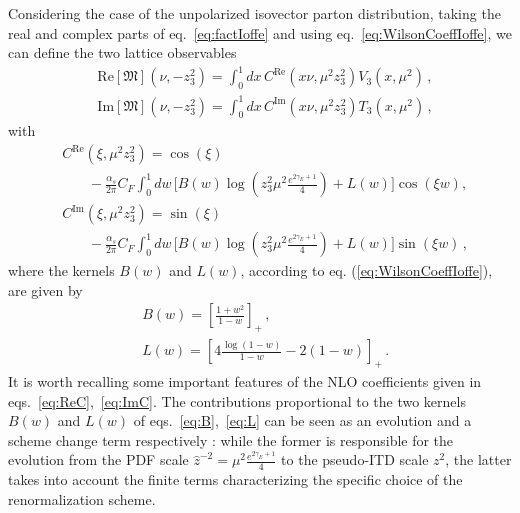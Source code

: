 Considering the case of the unpolarized isovector parton distribution, 
taking the real and complex parts of eq.~\eqref{eq:factIoffe} and using eq.~\eqref{eq:WilsonCoeffIoffe}, 
we can define the two lattice observables
\begin{align}
	\label{eq:Reppdf}
    &\text{Re}\left[\mathfrak{M}\right]\left(\nu, -z_3^2\right) 
    = \int_{0}^{1} dx\,C^{\text{Re}}\left(x\nu,\mu^2 z_3^2\right)V_3\left(x,\mu^2\right)\, ,\\
	\label{eq:Imppdf}
    &\text{Im}\left[\mathfrak{M}\right]\left(\nu, -z_3^2\right) 
    = \int_{0}^{1} dx\,C^{\text{Im}}\left(x\nu,\mu^2 z_3^2\right)T_3\left(x,\mu^2\right)\, ,
\end{align}
with
\begin{align}
	\label{eq:ReC}
	&C^{\text{Re}}\left(\xi,\mu^2 z_3^2\right) 
    = \cos\left(\xi\right) \nonumber\\
    &\,\,\,\,\,\,\,\,\,\,\,-\frac{\alpha_s}{2\pi} C_F \int_0^1 dw \, \biggl[B\left(w\right) 
    \log\left(z_3^2\mu^2\frac{e^{2\gamma_E + 1}}{4}\right) + L\left(w\right)\biggr] \cos\left(\xi w\right), \\
    \label{eq:ImC}
	&C^{\text{Im}}\left(\xi,\mu^2 z_3^2\right) 
    = \sin\left(\xi\right) \nonumber\\
    &\,\,\,\,\,\,\,\,\,\,\,-\frac{\alpha_s}{2\pi} C_F \int_0^1 dw \, \biggl[B\left(w\right)
    \log\left(z_3^2\mu^2\frac{e^{2\gamma_E + 1}}{4}\right)  + L\left(w\right)\biggr] \sin\left(\xi w\right)\, ,
\end{align}
where the kernels $B\left(w\right)$ and $L\left(w\right)$, 
according to eq. (\ref{eq:WilsonCoeffIoffe}), are given by 
\begin{align}
    \label{eq:B}
    &B\left(w\right) = \left[\frac{1+w^2}{1-w}\right]_+ \, ,\\
    \label{eq:L}
    &L\left(w\right) = \left[4\frac{\log\left(1-w\right)}{1-w} -2\left(1-w\right)\right]_+ \, .
\end{align}
It is worth recalling some important features of the NLO coefficients given in eqs.~\eqref{eq:ReC},~\eqref{eq:ImC}.
The contributions proportional to the two kernels $B\left(w\right)$ and $L\left(w\right)$ of eqs.~\eqref{eq:B},~\eqref{eq:L} 
can be seen as an evolution and a scheme change term respectively \cite{Joo:2019jct,Radyushkin:2018cvn}: 
while the former is responsible for the evolution from the PDF scale 
$\hat{z}^{-2} = \mu^2\frac{e^{2\gamma_E + 1}}{4} $ to the pseudo-ITD scale $z^2$, the latter takes into
account the finite terms characterizing the specific choice of the renormalization scheme. 
